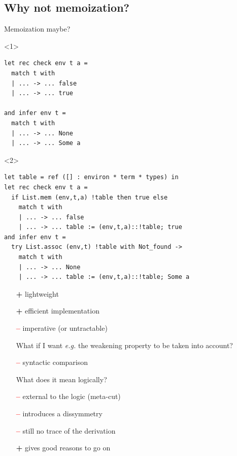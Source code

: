 \documentclass[ignorenonframetext,red]{beamer}
\newcommand\jwf[1]{{#1}\ \mathsf{wf}}
\newcommand\To{\Rightarrow}
\newcommand\itplus{\textcolor{green!60!black}{\textbf{\textsf{+}}}}
\newcommand\itminus{\textcolor{red}{\textbf{\textsf{--}}}}
\begin{document}
\subsection{Why not memoization?}

\begin{frame}[fragile]{Memoization maybe?}
  \begin{onlyenv}<1>
    \vspace{4em}
\begin{lstlisting}
let rec check env t a = 
  match t with
  | ... -> ... false
  | ... -> ... true

and infer env t =
  match t with 
  | ... -> ... None
  | ... -> ... Some a
\end{lstlisting}
  \end{onlyenv}
  \begin{onlyenv}<2>
    \vspace{3em}
\begin{lstlisting}
let table = ref ([] : environ * term * types) in
let rec check env t a = 
  if List.mem (env,t,a) !table then true else
    match t with
    | ... -> ... false
    | ... -> ... table := (env,t,a)::!table; true
and infer env t =
  try List.assoc (env,t) !table with Not_found ->
    match t with 
    | ... -> ... None
    | ... -> ... table := (env,t,a)::!table; Some a
\end{lstlisting}
  \end{onlyenv}
  \pause\pause
  \begin{enumerate}[<+->]
  \item[\itplus] lightweight
  \item[\itplus] efficient implementation
  \item[\itminus] imperative (or untractable)
  \item[] \footnotesize What if I want \emph{e.g.} the weakening property to be taken into account?
  \item [\itminus] syntactic comparison
  \item[] \footnotesize What does it mean logically?
  \item[\itminus] external to the logic (meta-cut)
  \item[\itminus] introduces a dissymmetry
  \item[\itminus] still no trace of the derivation
  \item[\itplus] gives good reasons to go on
  \end{enumerate}
\end{frame}
\end{document}
